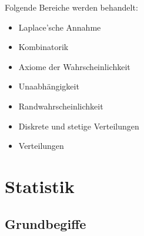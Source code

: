 \documentclass[12pt]{scrartcl}
\begin{document}
Folgende Bereiche werden behandelt:
\begin{itemize}
    \item Laplace'sche Annahme
    \item Kombinatorik
    \item Axiome der Wahrscheinlichkeit
    \item Unaabhängigkeit
    \item Randwahrscheinlichkeit
    \item Diskrete und stetige Verteilungen
    \item Verteilungen
\end{itemize}

\section{Statistik}

\subsection{Grundbegiffe}
\end{document}
